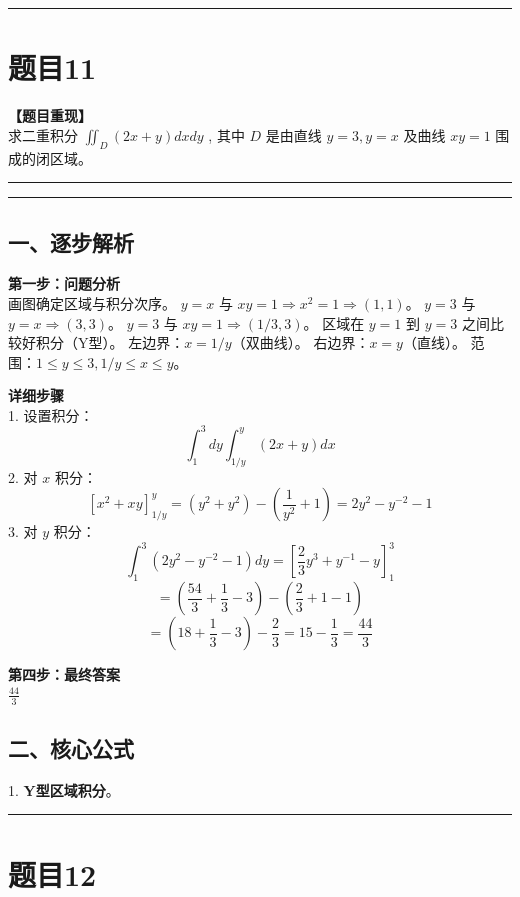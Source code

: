 \documentclass[12pt, a4paper]{ctexart}
\newcommand{\TopSeparator}{
    \par\noindent\rule{\textwidth}{1.5pt}\vspace{0.5em} %
}
\newcommand{\AnalysisSeparator}{
    \par\noindent\rule{\textwidth}{0.5pt}\vspace{0.2em}\hrule\vspace{0.5em} %
}
\newenvironment{RedAnalysis}{
    \par
    \color{red} %
}{
    \par
    \color{black} %
}
\begin{document}
\vspace{2em}

\TopSeparator
\section*{题目11}

\textbf{【题目重现】} \\
求二重积分 $ \iint_{D}(2x+y)dxdy $ , 其中 $D$ 是由直线 $y=3, y=x$ 及曲线 $xy=1$ 围成的闭区域。

\AnalysisSeparator

\begin{RedAnalysis}

\subsection*{一、逐步解析}

\textbf{第一步：问题分析} \\
画图确定区域与积分次序。
$y=x$ 与 $xy=1 \Rightarrow x^2=1 \Rightarrow (1,1)$。
$y=3$ 与 $y=x \Rightarrow (3,3)$。
$y=3$ 与 $xy=1 \Rightarrow (1/3, 3)$。
区域在 $y=1$ 到 $y=3$ 之间比较好积分（Y型）。
左边界：$x = 1/y$（双曲线）。
右边界：$x = y$（直线）。
范围：$1 \le y \le 3, 1/y \le x \le y$。

\textbf{详细步骤} \\
1. 设置积分：
   \[ \int_1^3 dy \int_{1/y}^y (2x+y) dx \]
2. 对 $x$ 积分：
   \[ [x^2 + xy]_{1/y}^y = (y^2 + y^2) - (\frac{1}{y^2} + 1) = 2y^2 - y^{-2} - 1 \]
3. 对 $y$ 积分：
   \[ \int_1^3 (2y^2 - y^{-2} - 1) dy = [\frac{2}{3}y^3 + y^{-1} - y]_1^3 \]
   \[ = (\frac{54}{3} + \frac{1}{3} - 3) - (\frac{2}{3} + 1 - 1) \]
   \[ = (18 + \frac{1}{3} - 3) - \frac{2}{3} = 15 - \frac{1}{3} = \frac{44}{3} \]

\textbf{第四步：最终答案} \\
$ \frac{44}{3} $

\subsection*{二、核心公式}
1. \textbf{Y型区域积分}。

\end{RedAnalysis}

\vspace{2em}

\TopSeparator
\section*{题目12}
\end{document}

